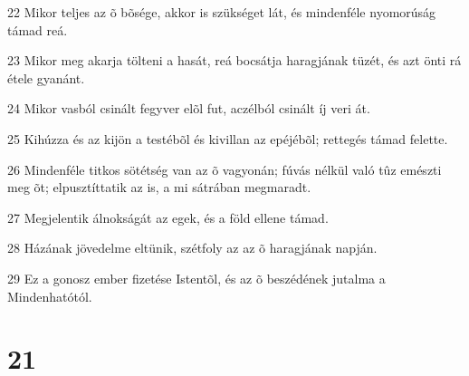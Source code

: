 \par 22 Mikor teljes az õ bõsége, akkor is szükséget lát, és mindenféle nyomorúság támad reá.
\par 23 Mikor meg akarja tölteni a hasát, reá bocsátja haragjának tüzét, és azt önti rá étele gyanánt.
\par 24 Mikor vasból csinált fegyver elõl fut, aczélból csinált íj veri át.
\par 25 Kihúzza és az kijön a testébõl és kivillan az epéjébõl; rettegés támad felette.
\par 26 Mindenféle titkos sötétség van az õ vagyonán; fúvás nélkül való tûz emészti meg õt; elpusztíttatik az is, a mi sátrában megmaradt.
\par 27 Megjelentik álnokságát az egek, és a föld ellene támad.
\par 28 Házának jövedelme eltünik, szétfoly az az õ haragjának napján.
\par 29 Ez a gonosz ember fizetése Istentõl, és az õ beszédének jutalma a Mindenhatótól.

\chapter{21}


